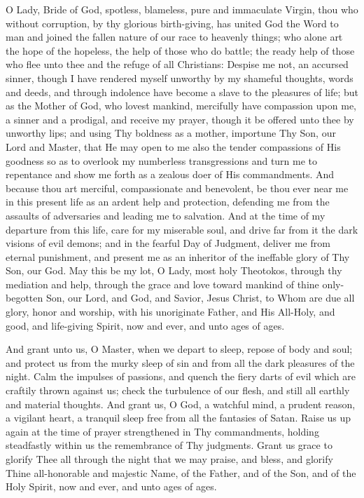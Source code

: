 \documentclass[twoside, letterpaper, 12pt]{report}
\begin{document}
\begin{maybetwocolumns}

O Lady, Bride of God, spotless, blameless, pure and immaculate Virgin,
thou who without corruption, by thy glorious birth-giving,
has united God the Word to man and joined the fallen nature of our race to heavenly things;
who alone art the hope of the hopeless, the help of those who do battle;
the ready help of those who flee unto thee and the refuge of all Christians:
Despise me not, an accursed sinner,
though I have rendered myself unworthy by my shameful thoughts, words and deeds,
and through indolence have become a slave to the pleasures of life;
but as the Mother of God, who lovest mankind, mercifully have compassion upon me,
a sinner and a prodigal, and receive my prayer,
though it be offered unto thee by unworthy lips;
and using Thy boldness as a mother, importune Thy Son, our Lord and Master,
that He may open to me also the tender compassions of His goodness
so as to overlook my numberless transgressions and turn me to repentance
and show me forth as a zealous doer of His commandments.
And because thou art merciful, compassionate and benevolent,
be thou ever near me in this present life as an ardent help and protection,
defending me from the assaults of adversaries and leading me to salvation.
And at the time of my departure from this life, care for my miserable soul,
and drive far from it the dark visions of evil demons; and in the fearful Day of Judgment,
deliver me from eternal punishment,
and present me as an inheritor of the ineffable glory of Thy Son, our God.
May this be my lot, O Lady, most holy Theotokos,
through thy mediation and help,
through the grace and love toward mankind of thine only-begotten Son,
our Lord, and God, and Savior, Jesus Christ,
to Whom are due all glory, honor and worship,
with his unoriginate Father, and His All-Holy, and good, and life-giving Spirit,
now and ever, and unto ages of ages.



And grant unto us, O Master, when we depart to sleep, repose of body and soul;
and protect us from the murky sleep of sin and from all the dark pleasures of the night.
Calm the impulses of passions,
and quench the fiery darts of evil which are craftily thrown against us;
check the turbulence of our flesh, and still all earthly and material thoughts.
And grant us, O God, a watchful mind, a prudent reason, a vigilant heart,
a tranquil sleep free from all the fantasies of Satan.
Raise us up again at the time of prayer strengthened in Thy commandments,
holding steadfastly within us the remembrance of Thy judgments.
Grant us grace to glorify Thee all through the night that we may praise,
and bless, and glorify Thine all-honorable and majestic Name,
of the Father, and of the Son, and of the Holy Spirit,
now and ever, and unto ages of ages.


\end{maybetwocolumns}
\end{document}
